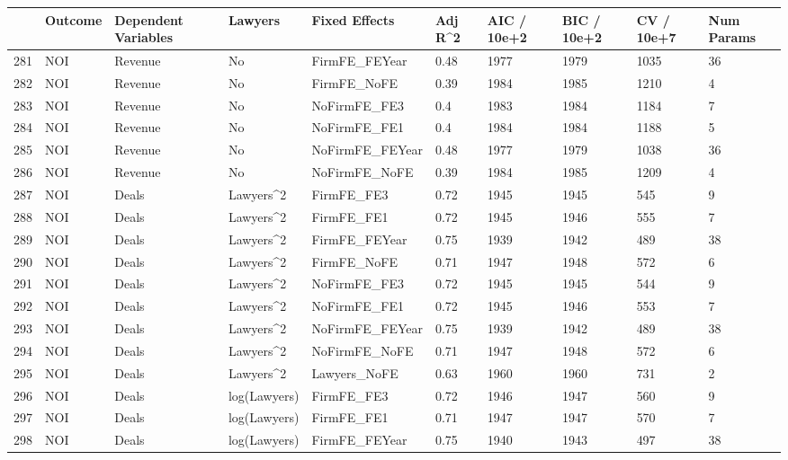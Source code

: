 \begin{table}[ht]
\centering
\begin{tabular}{rlllllllll}
  \hline
 & Outcome & Dependent Variables & Lawyers & Fixed Effects & Adj R^2 & AIC / 10e+2 & BIC / 10e+2 & CV / 10e+7 & Num Params \\ 
  \hline
281 & NOI & Revenue & No & FirmFE\_FEYear & 0.48 & 1977 & 1979 & 1035 & 36 \\ 
  282 & NOI & Revenue & No & FirmFE\_NoFE & 0.39 & 1984 & 1985 & 1210 & 4 \\ 
  283 & NOI & Revenue & No & NoFirmFE\_FE3 & 0.4 & 1983 & 1984 & 1184 & 7 \\ 
  284 & NOI & Revenue & No & NoFirmFE\_FE1 & 0.4 & 1984 & 1984 & 1188 & 5 \\ 
  285 & NOI & Revenue & No & NoFirmFE\_FEYear & 0.48 & 1977 & 1979 & 1038 & 36 \\ 
  286 & NOI & Revenue & No & NoFirmFE\_NoFE & 0.39 & 1984 & 1985 & 1209 & 4 \\ 
  287 & NOI & Deals & Lawyers^2 & FirmFE\_FE3 & 0.72 & 1945 & 1945 & 545 & 9 \\ 
  288 & NOI & Deals & Lawyers^2 & FirmFE\_FE1 & 0.72 & 1945 & 1946 & 555 & 7 \\ 
  289 & NOI & Deals & Lawyers^2 & FirmFE\_FEYear & 0.75 & 1939 & 1942 & 489 & 38 \\ 
  290 & NOI & Deals & Lawyers^2 & FirmFE\_NoFE & 0.71 & 1947 & 1948 & 572 & 6 \\ 
  291 & NOI & Deals & Lawyers^2 & NoFirmFE\_FE3 & 0.72 & 1945 & 1945 & 544 & 9 \\ 
  292 & NOI & Deals & Lawyers^2 & NoFirmFE\_FE1 & 0.72 & 1945 & 1946 & 553 & 7 \\ 
  293 & NOI & Deals & Lawyers^2 & NoFirmFE\_FEYear & 0.75 & 1939 & 1942 & 489 & 38 \\ 
  294 & NOI & Deals & Lawyers^2 & NoFirmFE\_NoFE & 0.71 & 1947 & 1948 & 572 & 6 \\ 
  295 & NOI & Deals & Lawyers^2 & Lawyers\_NoFE & 0.63 & 1960 & 1960 & 731 & 2 \\ 
  296 & NOI & Deals & log(Lawyers) & FirmFE\_FE3 & 0.72 & 1946 & 1947 & 560 & 9 \\ 
  297 & NOI & Deals & log(Lawyers) & FirmFE\_FE1 & 0.71 & 1947 & 1947 & 570 & 7 \\ 
  298 & NOI & Deals & log(Lawyers) & FirmFE\_FEYear & 0.75 & 1940 & 1943 & 497 & 38 \\ 

\end{tabular}
\end{table}
